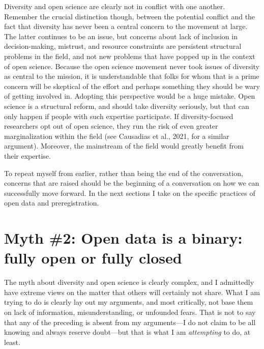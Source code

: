 \documentclass[authordate, empirical,issue]{jote-new-article}
\begin{document}
Diversity and open science are clearly not in conflict with one another. Remember the crucial distinction though, between the potential conflict and the fact that diversity has never been a central concern to the movement at large. The latter continues to be an issue, but concerns about lack of inclusion in decision-making, mistrust, and resource constraints are persistent structural problems in the field, and not new problems that have popped up in the context of open science. Because the open science movement never took issues of diversity as central to the mission, it is understandable that folks for whom that is a prime concern will be skeptical of the effort and perhaps something they should be wary of getting involved in. Adopting this perspective would be a huge mistake. Open science is a structural reform, and should take diversity seriously, but that can only happen if people with such expertise participate. If diversity-focused researchers opt out of open science, they run the risk of even greater marginalization within the field (see Causadias et al., 2021, for a similar argument). Moreover, the mainstream of the field would greatly benefit from their expertise.







To repeat myself from earlier, rather than being the end of the conversation, concerns that are raised should be the beginning of a conversation on how we can successfully move forward. In the next sections I take on the specific practices of open data and preregistration.







\section{Myth \#2: Open data is a binary: fully open or fully closed}







The myth about diversity and open science is clearly complex, and I admittedly have extreme views on the matter that others will certainly not share. What I am trying to do is clearly lay out my arguments, and most critically, not base them on lack of information, misunderstanding, or unfounded fears. That is not to say that any of the preceding is absent from my arguments—I do not claim to be all knowing and always reserve doubt—but that is what I am \emph{attempting} to do, at least.
\end{document}
